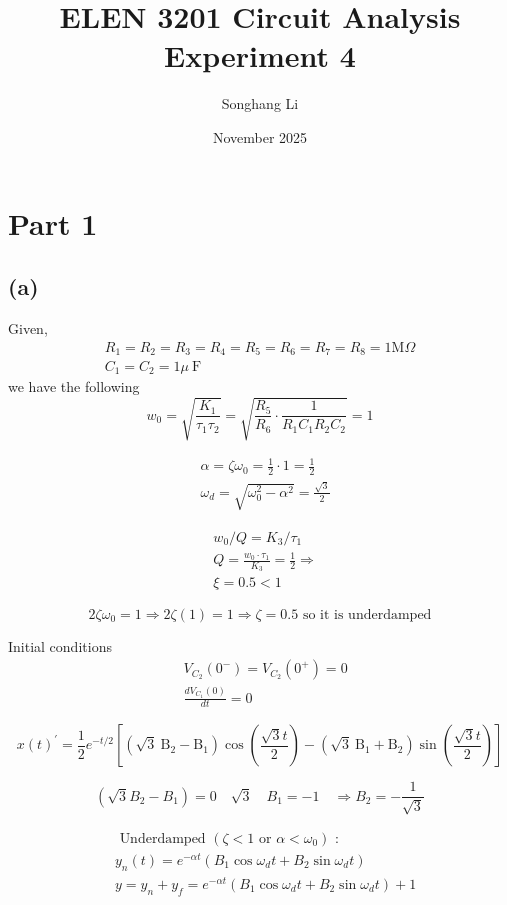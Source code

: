 \documentclass{article}
\title{ELEN 3201 Circuit Analysis Experiment 4}
\author{Songhang Li}
\date{November 2025}
\begin{document}
\maketitle


\section{Part 1}

\subsection{(a)}

Given, \[\begin{gathered}
R_1=R_2=R_3=R_4=R_5=R_6=R_7=R_8=1 \mathrm{M} \Omega \\
C_1=C_2=1 \mu \mathrm{~F}
\end{gathered}\]
 we have the following
 \[
w_0=\sqrt{\frac{K_1}{\tau_1 \tau_2}}=\sqrt{\frac{R_5}{R_6} \cdot \frac{1}{R_1 C_1 R_2 C_2}}=1
\]

\[\begin{aligned}
& \alpha=\zeta \omega_0=\frac{1}{2} \cdot 1=\frac{1}{2} \\
& \omega_d=\sqrt{\omega_0^2-\alpha^2}=\frac{\sqrt{3}}{2}
\end{aligned}\]

\[\begin{aligned}
& w_0 / Q=K_3 / \tau_1 \\
& Q=\frac{w_0 \cdot \tau_1}{K_3}=\frac{1}{2} \Rightarrow \\
& \xi=0.5 <1
\end{aligned}\]


\[2 \zeta \omega_0=1 \Rightarrow 2 \zeta(1)=1 \Rightarrow \zeta=0.5 \text{~so it is underdamped}\]


Initial conditions
\[\begin{aligned}
& V_{C_2}(0^-)=V_{C_2}\left(0^{+}\right)=0 \\
& \frac{d V_{C_1}(0)}{d t}=0
\end{aligned}\]


\[x(t)^{\prime}=\frac{1}{2} e^{-t / 2}\left[(\sqrt{3} \mathrm{~B_2}-\mathrm{B}_1) \cos \left(\frac{\sqrt{3} t}{2}\right)-(\sqrt{3} \mathrm{~B}_1+\mathrm{B}_2) \sin \left(\frac{\sqrt{3} t}{2}\right)\right]\]


\[\left(\sqrt{3} B_2-B_1\right)=0 \quad \sqrt{3} \quad B_1=-1 \quad \Rightarrow B_2=-\frac{1}{\sqrt{3}}\]


\[\begin{aligned}
&\text { Underdamped }\left(\zeta<1 \text { or } \alpha<\omega_0\right) \text { : }\\
&y_n(t)=e^{-\alpha t}\left(B_1 \cos \omega_d t+B_2 \sin \omega_d t\right)\\
&y = y_n+ y_f = e^{-\alpha t}\left(B_1 \cos \omega_d t+B_2 \sin \omega_d t\right) + 1
\end{aligned}\]
\end{document}
